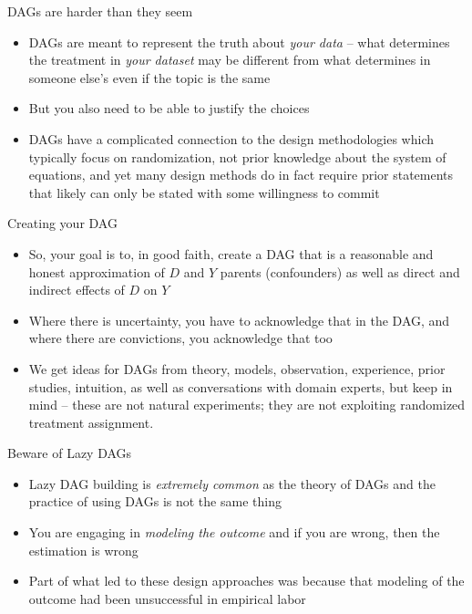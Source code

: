 \documentclass{beamer}
\begin{document}
\begin{frame}{DAGs are harder than they seem}

	\begin{itemize}
	\item DAGs are meant to represent the truth about \emph{your data} -- what determines the treatment in \emph{your dataset} may be different from what determines in someone else's even if the topic is the same
	\item But you also need to be able to justify the choices 
	\item DAGs have a complicated connection to the design methodologies which typically focus on randomization, not prior knowledge about the system of equations, and yet many design methods do in fact require prior statements that likely can only be stated with some willingness to commit
	\end{itemize}
\end{frame}

\begin{frame}{Creating your DAG}

	\begin{itemize}
	\item So, your goal is to, in good faith, create a DAG that is a reasonable and honest approximation of $D$ and $Y$ parents (confounders) as well as direct and indirect effects of $D$ on $Y$
	\item Where there is uncertainty, you have to acknowledge that in the DAG, and where there are convictions, you acknowledge that too
	\item We get ideas for DAGs from theory, models, observation, experience, prior studies, intuition, as well as conversations with domain experts, but keep in mind -- these are not natural experiments; they are not exploiting randomized treatment assignment.  
	\end{itemize}

\end{frame}

\begin{frame}{Beware of Lazy DAGs}

	\begin{itemize}
	\item Lazy DAG building is \emph{extremely common} as the theory of DAGs and the practice of using DAGs is not the same thing
	\item You are engaging in \emph{modeling the outcome} and if you are wrong, then the estimation is wrong
	\item Part of what led to these design approaches was because that modeling of the outcome had been unsuccessful in empirical labor
	\end{itemize}

\end{frame}
\end{document}
